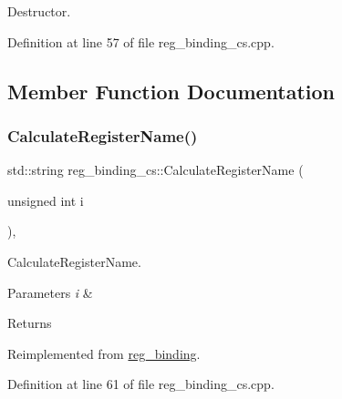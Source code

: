 Destructor. 



Definition at line 57 of file reg\+\_\+binding\+\_\+cs.\+cpp.



\subsection{Member Function Documentation}
\mbox{\label{classreg__binding__cs_a15bf6e04843ef122e38b1dfd8a118801}} 
\subsubsection{\texorpdfstring{Calculate\+Register\+Name()}{CalculateRegisterName()}}
{\footnotesize\ttfamily std\+::string reg\+\_\+binding\+\_\+cs\+::\+Calculate\+Register\+Name (\begin{DoxyParamCaption}\item[{unsigned int}]{i }\end{DoxyParamCaption})\hspace{0.3cm}{\ttfamily [protected]}, {\ttfamily [virtual]}}



Calculate\+Register\+Name. 


\begin{DoxyParams}{Parameters}
{\em i} & \\
\hline
\end{DoxyParams}
\begin{DoxyReturn}{Returns}

\end{DoxyReturn}


Reimplemented from \hyperlink{classreg__binding_ae3ecd3a0314a97830ad0acd2568547c2}{reg\+\_\+binding}.



Definition at line 61 of file reg\+\_\+binding\+\_\+cs.\+cpp.

\mbox{\label{classreg__binding__cs_acb0a006d620a6320239cc3973cf2198c}} 

